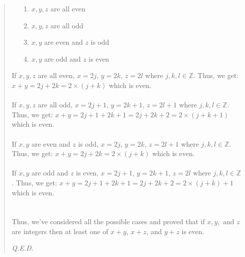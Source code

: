 \documentclass[12pt, a4paper]{article}                      %
\newcommand{\intz}{\mathbb{Z}}
\begin{document}
\begin{itemize}
\begin{quote}
\begin{itemize}
\item[1.]
$x,y,z$ are all even
\item[2.]
$x,y,z$ are all odd
\item[3.]
$x,y$ are even and $z$ is odd
\item[4.]
$x,y$ are odd and $z$ is even
\end{itemize}
If $x,y,z$ are all even, $x = 2j$, $y = 2k$, $z = 2l$ where $j,k,l \in \intz$. Thus, we get:
$x + y = 2j + 2k = 2 \times (j + k)$ which is even.
\\\\
If $x,y,z$ are all odd, $x = 2j + 1$, $y = 2k + 1$, $z = 2l + 1$ where $j,k,l \in \intz$. Thus, we get:
$x + y = 2j + 1 + 2k + 1 = 2j + 2k + 2 = 2 \times (j + k + 1)$ which is even.
\\\\
If $x,y$ are even and $z$ is odd, $x = 2j$, $y = 2k$, $z = 2l + 1$ where $j,k,l \in \intz$. Thus, we get:
$x + y = 2j + 2k = 2 \times (j + k)$ which is even.
\\\\
If $x,y$ are odd and $z$ is even, $x = 2j + 1$, $y = 2k + 1$, $z = 2l$ where $j,k,l \in \intz$. Thus, we get:
$x + y = 2j + 1 + 2k + 1 = 2j + 2k + 2 = 2 \times (j + k) + 1$ which is even.
\\\\\\
Thus, we've considered all the possible cases and proved that if $x, y, \mbox{ and } z$ are integers then at
least one of $x + y$, $x + z$, and $y + z$ is even.
\begin{flushright}
\textit{Q.E.D.}
\end{flushright}
\end{quote}


\end{itemize}
\end{document}
